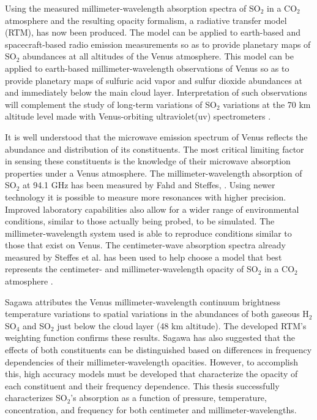 Using the measured millimeter-wavelength absorption spectra of SO$_2$ in a CO$_2$ atmosphere and the resulting opacity formalism, a radiative transfer model (RTM), has now been produced. The model can be applied to earth-based and spacecraft-based radio emission measurements so as to provide planetary maps of SO$_2$ abundances at all altitudes of the Venus atmosphere. %
This model can be applied to earth-based millimeter-wavelength observations of Venus so as to provide planetary maps of sulfuric acid vapor and sulfur dioxide abundances at and immediately below the main cloud layer. Interpretation of such observations will complement the study of long-term variations of SO$_2$ variations at the 70 km altitude level made with Venus-orbiting ultraviolet(uv) spectrometers \cite{Esposito-2012}. 

It is well understood that the microwave emission spectrum of Venus reflects the abundance and distribution of its constituents. The most critical limiting factor in sensing these constituents is the knowledge of their microwave absorption properties under a Venus atmosphere. 
The millimeter-wavelength absorption of SO$_2$ at 94.1 GHz has been measured by Fahd and Steffes, \cite{Fahd-thesis}. 
Using newer technology it is possible to measure more resonances with higher precision. Improved laboratory capabilities also allow for a wider range of environmental conditions, similar to those actually being probed, to be simulated. The millimeter-wavelength system used is able to reproduce conditions similar to those that exist on Venus. The centimeter-wave absorption spectra already measured by Steffes et al. \cite{Steffes-2014} has been used to help choose a model that best represents the centimeter- and millimeter-wavelength opacity of SO$_2$ in a CO$_2$ atmosphere \cite{Butler-2001}. 

Sagawa \cite{Sagawa-2008} attributes the Venus millimeter-wavelength continuum brightness temperature variations to spatial variations in the abundances of both gaseous H$_2$SO$_4$ and SO$_2$ just below the cloud layer (48 km altitude). The developed RTM's weighting function confirms these results. Sagawa has also suggested that the effects of both constituents can be distinguished based on differences in frequency dependencies of their millimeter-wavelength opacities. However, to accomplish this, high accuracy models must be developed that characterize the opacity of each constituent and their frequency dependence. This thesis successfully characterizes SO$_2$'s absorption as a function of pressure, temperature, concentration, and frequency for both centimeter and millimeter-wavelengths. 


